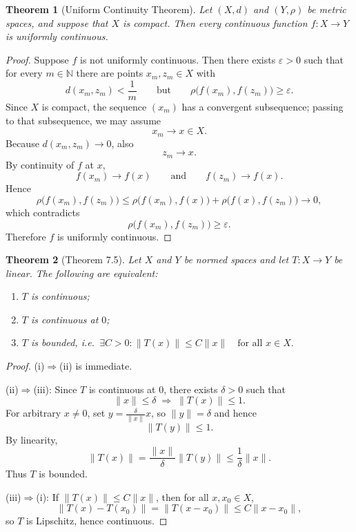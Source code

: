 \documentclass[12pt]{article}
\newtheorem{theorem}{Theorem}
\begin{document}
\begin{theorem}[Uniform Continuity Theorem]
Let $(X,d)$ and $(Y,\rho)$ be metric spaces, and suppose that $X$ is compact.
Then every continuous function $f:X\to Y$ is uniformly continuous.
\end{theorem}

\begin{proof}
Suppose $f$ is not uniformly continuous. Then there exists $\varepsilon>0$ such that for every $m\in\mathbb N$ there are points $x_m,z_m\in X$ with
\[
d(x_m,z_m)<\frac1m
\qquad\text{but}\qquad
\rho\bigl(f(x_m),f(z_m)\bigr)\ge \varepsilon.
\]
Since $X$ is compact, the sequence $(x_m)$ has a convergent subsequence; passing to that subsequence, we may assume
\[
x_m\to x\in X.
\]
Because $d(x_m,z_m)\to 0$, also
\[
z_m\to x.
\]
By continuity of $f$ at $x$,
\[
f(x_m)\to f(x)
\qquad\text{and}\qquad
f(z_m)\to f(x).
\]
Hence
\[
\rho\bigl(f(x_m),f(z_m)\bigr)
\le
\rho\bigl(f(x_m),f(x)\bigr)+\rho\bigl(f(x),f(z_m)\bigr)\to 0,
\]
which contradicts
\[
\rho\bigl(f(x_m),f(z_m)\bigr)\ge \varepsilon.
\]
Therefore $f$ is uniformly continuous.
\end{proof}

\begin{theorem}[Theorem 7.5]
Let $X$ and $Y$ be normed spaces and let $T:X\to Y$ be linear. The following are equivalent:
\begin{enumerate}[label=(\roman*)]
\item $T$ is continuous;
\item $T$ is continuous at $0$;
\item $T$ is bounded, i.e.\ $\exists C>0 : \|T(x)\|\le C\|x\| \quad \text{for all } x\in X.$
\end{enumerate}
\end{theorem}

\begin{proof}
(i)$\Rightarrow$(ii) is immediate.

(ii)$\Rightarrow$(iii): Since $T$ is continuous at $0$, there exists $\delta>0$ such that
\[
\|x\|\le \delta \;\Rightarrow\; \|T(x)\|\le 1.
\]
For arbitrary $x\neq 0$, set $y=\frac{\delta}{\|x\|}x$, so $\|y\|=\delta$ and hence
\[
\|T(y)\|\le 1.
\]
By linearity,
\[
\|T(x)\| = \frac{\|x\|}{\delta}\|T(y)\|\le \frac{1}{\delta}\|x\|.
\]
Thus $T$ is bounded.

(iii)$\Rightarrow$(i): If $\|T(x)\|\le C\|x\|$, then for all $x,x_0\in X$,
\[
\|T(x)-T(x_0)\| = \|T(x-x_0)\|\le C\|x-x_0\|,
\]
so $T$ is Lipschitz, hence continuous.
\end{proof}
\end{document}
